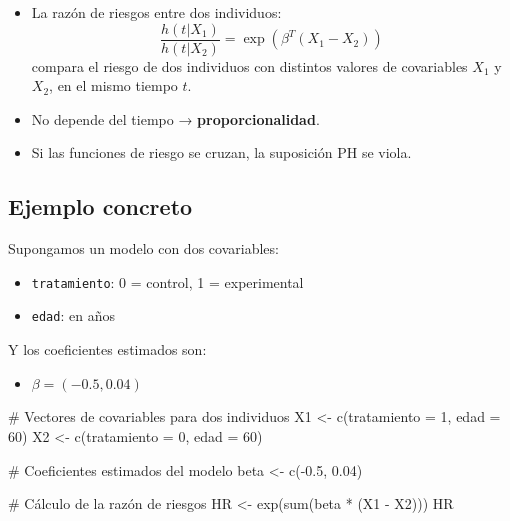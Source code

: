 \documentclass[
]{article}
\newenvironment{Shaded}{\begin{snugshade}}{\end{snugshade}}
\newcommand{\AttributeTok}[1]{\textcolor[rgb]{0.40,0.45,0.13}{#1}}
\newcommand{\CommentTok}[1]{\textcolor[rgb]{0.37,0.37,0.37}{#1}}
\newcommand{\DecValTok}[1]{\textcolor[rgb]{0.68,0.00,0.00}{#1}}
\newcommand{\FloatTok}[1]{\textcolor[rgb]{0.68,0.00,0.00}{#1}}
\newcommand{\FunctionTok}[1]{\textcolor[rgb]{0.28,0.35,0.67}{#1}}
\newcommand{\NormalTok}[1]{\textcolor[rgb]{0.00,0.23,0.31}{#1}}
\newcommand{\OtherTok}[1]{\textcolor[rgb]{0.00,0.23,0.31}{#1}}
\newcommand{\SpecialCharTok}[1]{\textcolor[rgb]{0.37,0.37,0.37}{#1}}
\providecommand{\tightlist}{%
  \setlength{\itemsep}{0pt}\setlength{\parskip}{0pt}}
\begin{document}
\begin{itemize}
\item
  La razón de riesgos entre dos individuos: \[
  \frac{h(t|X_1)}{h(t|X_2)} = \exp(\beta^T(X_1 - X_2))
  \] compara el riesgo de dos individuos con distintos valores de
  covariables \(X_1\) y \(X_2\), en el mismo tiempo \(t\).
\item
  No depende del tiempo → \textbf{proporcionalidad}.
\item
  Si las funciones de riesgo se cruzan, la suposición PH se viola.
\end{itemize}

\subsection{Ejemplo concreto}\label{ejemplo-concreto}

Supongamos un modelo con dos covariables:

\begin{itemize}
\tightlist
\item
  \texttt{tratamiento}: 0 = control, 1 = experimental
\item
  \texttt{edad}: en años
\end{itemize}

Y los coeficientes estimados son:

\begin{itemize}
\tightlist
\item
  \(\beta = (-0.5, 0.04)\)
\end{itemize}

\begin{Shaded}
\begin{Highlighting}[]
\CommentTok{\# Vectores de covariables para dos individuos}
\NormalTok{X1 }\OtherTok{\textless{}{-}} \FunctionTok{c}\NormalTok{(}\AttributeTok{tratamiento =} \DecValTok{1}\NormalTok{, }\AttributeTok{edad =} \DecValTok{60}\NormalTok{)}
\NormalTok{X2 }\OtherTok{\textless{}{-}} \FunctionTok{c}\NormalTok{(}\AttributeTok{tratamiento =} \DecValTok{0}\NormalTok{, }\AttributeTok{edad =} \DecValTok{60}\NormalTok{)}

\CommentTok{\# Coeficientes estimados del modelo}
\NormalTok{beta }\OtherTok{\textless{}{-}} \FunctionTok{c}\NormalTok{(}\SpecialCharTok{{-}}\FloatTok{0.5}\NormalTok{, }\FloatTok{0.04}\NormalTok{)}

\CommentTok{\# Cálculo de la razón de riesgos}
\NormalTok{HR }\OtherTok{\textless{}{-}} \FunctionTok{exp}\NormalTok{(}\FunctionTok{sum}\NormalTok{(beta }\SpecialCharTok{*}\NormalTok{ (X1 }\SpecialCharTok{{-}}\NormalTok{ X2)))}
\NormalTok{HR}
\end{Highlighting}
\end{Shaded}
\end{document}
